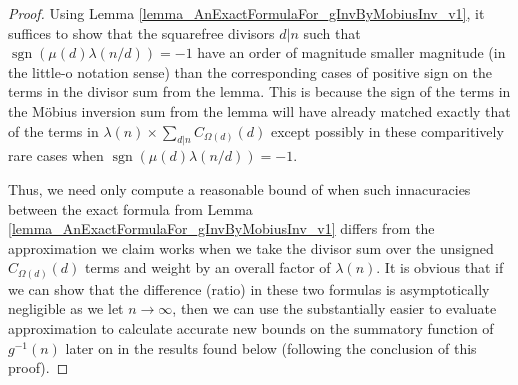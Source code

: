 \documentclass[11pt,reqno,a4letter]{article}
\numberwithin{figure}{section}
\numberwithin{table}{section}
\theoremstyle{plain}
\numberwithin{theorem}{section}
\theoremstyle{definition}
\begin{document}
\begin{proof} 
Using Lemma \ref{lemma_AnExactFormulaFor_gInvByMobiusInv_v1}, it suffices to show that 
the squarefree divisors $d|n$ such that $\operatorname{sgn}(\mu(d) \lambda(n/d)) = -1$ 
have an order of magnitude smaller magnitude (in the little-o notation sense) 
than the corresponding cases of positive sign on 
the terms in the divisor sum from the lemma. 
This is because the sign of the terms in the M\"obius inversion sum from the lemma will 
have already matched exactly that 
of the terms in $\lambda(n) \times \sum_{d|n} C_{\Omega(d)}(d)$ except possibly in these 
comparitively rare cases when $\operatorname{sgn}(\mu(d) \lambda(n/d)) = -1$. 

Thus, we need only compute a reasonable bound of when such innacuracies between the exact formula from 
Lemma \ref{lemma_AnExactFormulaFor_gInvByMobiusInv_v1} differs from the approximation we claim 
works when we take the divisor sum over the unsigned $C_{\Omega(d)}(d)$ terms and weight by an 
overall factor of $\lambda(n)$. It is obvious that if we can show that the difference (ratio) in these 
two formulas is asymptotically negligible as we let $n \rightarrow \infty$, then we can use the 
substantially easier to evaluate approximation to calculate accurate new bounds on the summatory 
function of $g^{-1}(n)$ later on in the results found below (following the conclusion of this proof). 


\end{proof}
\end{document}
